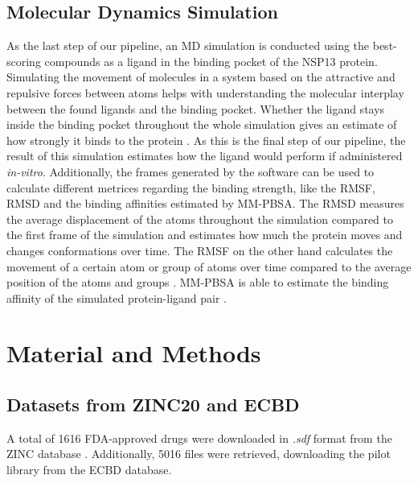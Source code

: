 \documentclass[11pt, letterpaper, titlepage]{article}
\renewcommand{\cite}{\parencite}
\begin{document}
\subsection{Molecular Dynamics Simulation}
As the last step of our pipeline, an \ac{MD} simulation is conducted using the best-scoring compounds as a ligand in the binding pocket of the \ac{NSP13} protein. Simulating the movement of molecules in a system based on the attractive and repulsive forces between atoms helps with understanding the molecular interplay between the found ligands and the binding pocket. Whether the ligand stays inside  the binding pocket throughout the whole simulation gives an estimate of how strongly it binds to the protein \cite{MD_Basics}. As this is the final step of our pipeline, the result of this simulation estimates how the ligand would perform if administered \textit{in-vitro}. Additionally, the frames generated by the software can be used to calculate different metrices regarding the binding strength, like the \ac{RMSF}, \ac{RMSD} and the binding affinities estimated by \ac{MM-PBSA}. The \ac{RMSD} measures the average displacement of the atoms throughout the simulation compared to the first frame of the simulation and estimates how much the protein moves and changes conformations over time. The \ac{RMSF} on the other hand calculates the movement of a certain atom or group of atoms over time compared to the average position of the atoms and groups \cite{RMSD_RMSF}. \ac{MM-PBSA} is able to estimate the binding affinity of the simulated protein-ligand pair \cite{MM_PBSA}.


\section{Material and Methods}
\subsection{Datasets from ZINC20 and ECBD}
A total of 1616 \ac{FDA}-approved drugs were downloaded in \textit{.sdf} format from the ZINC database \cite{Irwin.2020}. Additionally, 5016 files were retrieved, downloading the pilot library from the ECBD database.
\end{document}
